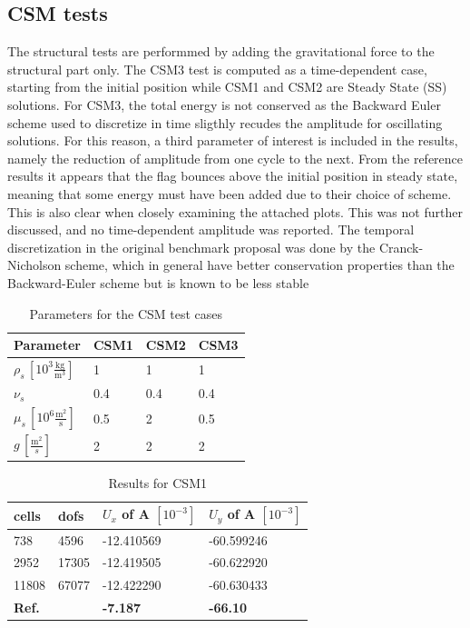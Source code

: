 \subsection{CSM tests}
The structural tests are performmed by adding the gravitational force to the structural part only. The CSM3 test is computed as a time-dependent case, starting from the initial position while CSM1 and CSM2 are Steady State (SS) solutions. For CSM3, the total energy is not conserved as the Backward Euler scheme used to discretize in time sligthly recudes the amplitude for oscillating solutions. For this reason, a third parameter of interest is included in the results, namely the reduction of amplitude from one cycle to the next. From the reference results it appears that the flag bounces above the initial position in steady state, meaning that some energy must have been added due to their choice of scheme. This is also clear when closely examining the attached plots. This was not further discussed, and no time-dependent amplitude was reported. The temporal discretization in the original benchmark proposal was done by the Cranck-Nicholson scheme, which in general have better conservation properties than the Backward-Euler scheme but is known to be less stable \cite{Hron06}
\begin{table}[!ht]
\begin{center}
  \begin{tabular}{|l | l | l | l|} \hline
	Parameter & CSM1 & CSM2 & CSM3 \\ \hline
    $\rho_s\, [10^3\frac{\text{kg}}{\text{m}^3}]$  & 1 & 1 & 1 \\   \hline
    $\nu_s $ & 0.4 & 0.4 & 0.4 \\ \hline
    $\mu_s \,[10^{6}\frac{\text{m}^2}{\text{s}}]$ & 0.5 & 2 & 0.5   \\ \hline
    $g \, [\frac{\text{m}^2}{s}]$ & 2 & 2 & 2 \\ \hline
    \hline
  \end{tabular}
\end{center}
\caption{Parameters for the CSM test cases}
\end{table}

\begin{table}[!h]
\begin{center}
  \begin{tabular}{|l | l | l | l|} \hline
	cells & dofs & $U_x$ of A $[10^{-3}]$ & $U_y$ of A $[10^{-3}]$\\ \hline
	738  & 4596  & -12.410569 & -60.599246 \\   \hline
	2952 & 17305 & -12.419505 & -60.622920 \\ \hline
	11808 & 67077 & -12.422290 & -60.630433   \\ \hline \hline
    \textbf{Ref.}  & & \textbf{-7.187} & \textbf{-66.10} \\ \hline 
    \hline
  \end{tabular}
\end{center}
\caption{Results for CSM1}
\end{table}

